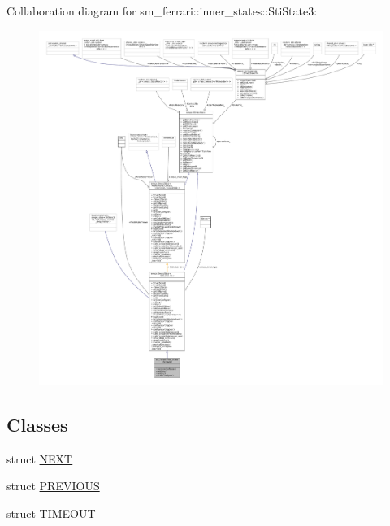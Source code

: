 Collaboration diagram for sm\+\_\+ferrari\+:\+:inner\+\_\+states\+:\+:Sti\+State3\+:
\nopagebreak
\begin{figure}[H]
\begin{center}
\leavevmode
\includegraphics[width=350pt]{structsm__ferrari_1_1inner__states_1_1StiState3__coll__graph}
\end{center}
\end{figure}
\subsection*{Classes}
\begin{DoxyCompactItemize}
\item 
struct \hyperlink{structsm__ferrari_1_1inner__states_1_1StiState3_1_1NEXT}{N\+E\+XT}
\item 
struct \hyperlink{structsm__ferrari_1_1inner__states_1_1StiState3_1_1PREVIOUS}{P\+R\+E\+V\+I\+O\+US}
\item 
struct \hyperlink{structsm__ferrari_1_1inner__states_1_1StiState3_1_1TIMEOUT}{T\+I\+M\+E\+O\+UT}
\end{DoxyCompactItemize}
